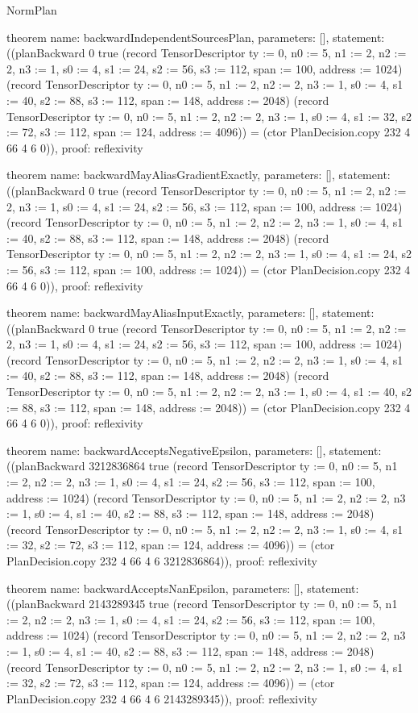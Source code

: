 \begin{lexlean}{NormPlan}
\begin{semanticmodule}
theorem{
  name: backwardIndependentSourcesPlan,
  parameters: [],
  statement: ((planBackward 0 true (record TensorDescriptor {ty := 0, n0 := 5, n1 := 2, n2 := 2, n3 := 1, s0 := 4, s1 := 24, s2 := 56, s3 := 112, span := 100, address := 1024}) (record TensorDescriptor {ty := 0, n0 := 5, n1 := 2, n2 := 2, n3 := 1, s0 := 4, s1 := 40, s2 := 88, s3 := 112, span := 148, address := 2048}) (record TensorDescriptor {ty := 0, n0 := 5, n1 := 2, n2 := 2, n3 := 1, s0 := 4, s1 := 32, s2 := 72, s3 := 112, span := 124, address := 4096})) = (ctor PlanDecision.copy 232 4 66 4 6 0)),
  proof: reflexivity{}
}

theorem{
  name: backwardMayAliasGradientExactly,
  parameters: [],
  statement: ((planBackward 0 true (record TensorDescriptor {ty := 0, n0 := 5, n1 := 2, n2 := 2, n3 := 1, s0 := 4, s1 := 24, s2 := 56, s3 := 112, span := 100, address := 1024}) (record TensorDescriptor {ty := 0, n0 := 5, n1 := 2, n2 := 2, n3 := 1, s0 := 4, s1 := 40, s2 := 88, s3 := 112, span := 148, address := 2048}) (record TensorDescriptor {ty := 0, n0 := 5, n1 := 2, n2 := 2, n3 := 1, s0 := 4, s1 := 24, s2 := 56, s3 := 112, span := 100, address := 1024})) = (ctor PlanDecision.copy 232 4 66 4 6 0)),
  proof: reflexivity{}
}

theorem{
  name: backwardMayAliasInputExactly,
  parameters: [],
  statement: ((planBackward 0 true (record TensorDescriptor {ty := 0, n0 := 5, n1 := 2, n2 := 2, n3 := 1, s0 := 4, s1 := 24, s2 := 56, s3 := 112, span := 100, address := 1024}) (record TensorDescriptor {ty := 0, n0 := 5, n1 := 2, n2 := 2, n3 := 1, s0 := 4, s1 := 40, s2 := 88, s3 := 112, span := 148, address := 2048}) (record TensorDescriptor {ty := 0, n0 := 5, n1 := 2, n2 := 2, n3 := 1, s0 := 4, s1 := 40, s2 := 88, s3 := 112, span := 148, address := 2048})) = (ctor PlanDecision.copy 232 4 66 4 6 0)),
  proof: reflexivity{}
}

theorem{
  name: backwardAcceptsNegativeEpsilon,
  parameters: [],
  statement: ((planBackward 3212836864 true (record TensorDescriptor {ty := 0, n0 := 5, n1 := 2, n2 := 2, n3 := 1, s0 := 4, s1 := 24, s2 := 56, s3 := 112, span := 100, address := 1024}) (record TensorDescriptor {ty := 0, n0 := 5, n1 := 2, n2 := 2, n3 := 1, s0 := 4, s1 := 40, s2 := 88, s3 := 112, span := 148, address := 2048}) (record TensorDescriptor {ty := 0, n0 := 5, n1 := 2, n2 := 2, n3 := 1, s0 := 4, s1 := 32, s2 := 72, s3 := 112, span := 124, address := 4096})) = (ctor PlanDecision.copy 232 4 66 4 6 3212836864)),
  proof: reflexivity{}
}

theorem{
  name: backwardAcceptsNanEpsilon,
  parameters: [],
  statement: ((planBackward 2143289345 true (record TensorDescriptor {ty := 0, n0 := 5, n1 := 2, n2 := 2, n3 := 1, s0 := 4, s1 := 24, s2 := 56, s3 := 112, span := 100, address := 1024}) (record TensorDescriptor {ty := 0, n0 := 5, n1 := 2, n2 := 2, n3 := 1, s0 := 4, s1 := 40, s2 := 88, s3 := 112, span := 148, address := 2048}) (record TensorDescriptor {ty := 0, n0 := 5, n1 := 2, n2 := 2, n3 := 1, s0 := 4, s1 := 32, s2 := 72, s3 := 112, span := 124, address := 4096})) = (ctor PlanDecision.copy 232 4 66 4 6 2143289345)),
  proof: reflexivity{}
}


\end{semanticmodule}
\end{lexlean}
